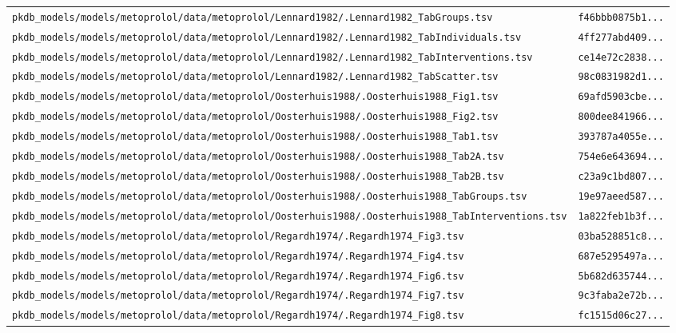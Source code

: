\documentclass{article}
\begin{document}
\begin{longtable}{ll}
\texttt{pkdb\_models/models/metoprolol/data/metoprolol/Lennard1982/.Lennard1982\_TabGroups.tsv} & \texttt{f46bbb0875b1...} \\
\texttt{pkdb\_models/models/metoprolol/data/metoprolol/Lennard1982/.Lennard1982\_TabIndividuals.tsv} & \texttt{4ff277abd409...} \\
\texttt{pkdb\_models/models/metoprolol/data/metoprolol/Lennard1982/.Lennard1982\_TabInterventions.tsv} & \texttt{ce14e72c2838...} \\
\texttt{pkdb\_models/models/metoprolol/data/metoprolol/Lennard1982/.Lennard1982\_TabScatter.tsv} & \texttt{98c0831982d1...} \\
\texttt{pkdb\_models/models/metoprolol/data/metoprolol/Oosterhuis1988/.Oosterhuis1988\_Fig1.tsv} & \texttt{69afd5903cbe...} \\
\texttt{pkdb\_models/models/metoprolol/data/metoprolol/Oosterhuis1988/.Oosterhuis1988\_Fig2.tsv} & \texttt{800dee841966...} \\
\texttt{pkdb\_models/models/metoprolol/data/metoprolol/Oosterhuis1988/.Oosterhuis1988\_Tab1.tsv} & \texttt{393787a4055e...} \\
\texttt{pkdb\_models/models/metoprolol/data/metoprolol/Oosterhuis1988/.Oosterhuis1988\_Tab2A.tsv} & \texttt{754e6e643694...} \\
\texttt{pkdb\_models/models/metoprolol/data/metoprolol/Oosterhuis1988/.Oosterhuis1988\_Tab2B.tsv} & \texttt{c23a9c1bd807...} \\
\texttt{pkdb\_models/models/metoprolol/data/metoprolol/Oosterhuis1988/.Oosterhuis1988\_TabGroups.tsv} & \texttt{19e97aeed587...} \\
\texttt{pkdb\_models/models/metoprolol/data/metoprolol/Oosterhuis1988/.Oosterhuis1988\_TabInterventions.tsv} & \texttt{1a822feb1b3f...} \\
\texttt{pkdb\_models/models/metoprolol/data/metoprolol/Regardh1974/.Regardh1974\_Fig3.tsv} & \texttt{03ba528851c8...} \\
\texttt{pkdb\_models/models/metoprolol/data/metoprolol/Regardh1974/.Regardh1974\_Fig4.tsv} & \texttt{687e5295497a...} \\
\texttt{pkdb\_models/models/metoprolol/data/metoprolol/Regardh1974/.Regardh1974\_Fig6.tsv} & \texttt{5b682d635744...} \\
\texttt{pkdb\_models/models/metoprolol/data/metoprolol/Regardh1974/.Regardh1974\_Fig7.tsv} & \texttt{9c3faba2e72b...} \\
\texttt{pkdb\_models/models/metoprolol/data/metoprolol/Regardh1974/.Regardh1974\_Fig8.tsv} & \texttt{fc1515d06c27...} \\

\end{longtable}
\end{document}
